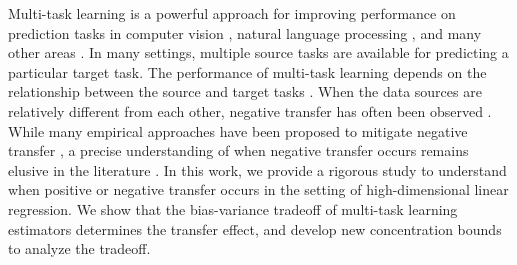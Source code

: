 Multi-task learning is a powerful approach for improving performance on prediction tasks in computer vision \cite{chexnet17,ZSSGM18}, natural language processing \cite{GLUE,superglue}, and many other areas \cite{ZY17}.
In many settings, multiple source tasks are available for predicting a particular target task.
The performance of multi-task learning depends on the relationship between the source and target tasks \cite{C97}.
When the data sources are relatively different from each other, negative transfer has often been observed \cite{PY09,AP16,BS17}.
While many empirical approaches have been proposed to mitigate negative transfer \cite{ZY17}, a precise understanding of when negative transfer occurs remains elusive in the literature \cite{R17}.
In this work, we provide a rigorous study to understand when positive or negative transfer occurs in the setting of high-dimensional linear regression.
We show that the bias-variance tradeoff of multi-task learning estimators determines the transfer effect, and develop new concentration bounds to analyze the tradeoff.

